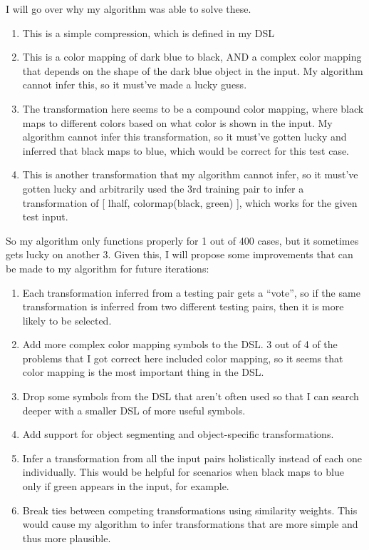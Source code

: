 \documentclass[letterpaper]{article} %
\begin{document}
\bigskip

I will go over why my algorithm was able to solve these.
\begin{enumerate}
    \item This is a simple compression, which is defined in my DSL
    \item This is a color mapping of dark blue to black, AND a complex color mapping that depends on the shape of the dark blue object in the input. My algorithm cannot infer this, so it must've made a lucky guess.
    \item The transformation here seems to be a compound color mapping, where black maps to different colors based on what color is shown in the input. My algorithm cannot infer this transformation, so it must've gotten lucky and inferred that black maps to blue, which would be correct for this test case.
    \item This is another transformation that my algorithm cannot infer, so it must've gotten lucky and arbitrarily used the 3rd training pair to infer a transformation of [ lhalf, colormap(black, green) ], which works for the given test input. 
\end{enumerate}

\bigskip

So my algorithm only functions properly for 1 out of 400 cases, but it sometimes gets lucky on another 3. Given this, I will propose some improvements that can be made to my algorithm for future iterations:

\begin{enumerate}
    \item Each transformation inferred from a testing pair gets a ``vote'', so if the same transformation is inferred from two different testing pairs, then it is more likely to be selected.

    \item Add more complex color mapping symbols to the DSL. 3 out of 4 of the problems that I got correct here included color mapping, so it seems that color mapping is the most important thing in the DSL.

    \item Drop some symbols from the DSL that aren't often used so that I can search deeper with a smaller DSL of more useful symbols.

    \item Add support for object segmenting and object-specific transformations.

    \item Infer a transformation from all the input pairs holistically instead of each one individually. This would be helpful for scenarios when black maps to blue only if green appears in the input, for example.

    \item Break ties between competing transformations using similarity weights. This would cause my algorithm to infer transformations that are more simple and thus more plausible.
\end{enumerate}
\end{document}
